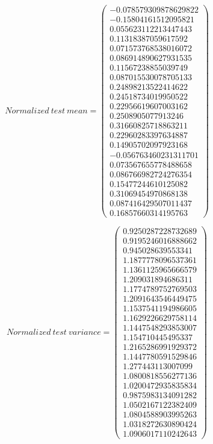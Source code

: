 \documentclass[12pt, a4paper]{article}
\begin{document}
\[Normalized\ test\ mean = \left(
\begin{array}{c}
-0.078579309878629822\\
-0.15804161512095821\\
0.055623112213447443\\
0.11318387059617592\\
0.071573768538016072\\
0.086914890627931535\\
0.11567238855039749\\
0.087015530078705133\\
0.24898213522414622\\
0.24518734019950522\\
0.22956619607003162\\
0.2508905077913246\\
0.31660825718863211\\
0.22960283397634887\\
0.14905702097923168\\
-0.056763460231311701\\
0.073567655778488658\\
0.086766982724276354\\
0.15477244610125082\\
0.31069454970868138\\
0.087416429507011437\\
0.16857660314195763
\end{array}
\right) \]

\[Normalized\ test\ variance = \left(
\begin{array}{c}
0.9250287228732689\\
0.9195246016888662\\
0.945028639553341\\
1.1877778096537361\\
1.1361125965666579\\
1.209031894686311\\
1.1774789752769503\\
1.2091643546449475\\
1.1537541194986605\\
1.1629226629758114\\
1.1447548293853007\\
1.154710445495337\\
1.2165286991929372\\
1.1447780591529846\\
1.277443113007099\\
1.0800818556277136\\
1.0200472935835834\\
0.9875983134091282\\
1.0502167122382409\\
1.0804588903995263\\
1.0318272630890424\\
1.0906017110242643
\end{array}
\right) \]
\end{document}
